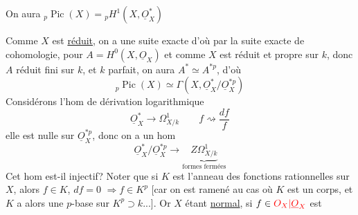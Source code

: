 On aura ${}_p\operatorname{Pic}(X)={}_pH^1(X,\underline O_X^*)$

Comme $X$ est \uline{réduit}, on a une suite exacte
d'où par la suite exacte de cohomologie, pour $A=H^0(X,\underline O_X)$
et comme $X$ est réduit et propre sur $k$, donc $A$ réduit
fini  sur $k$, et $k$ parfait, on aura
$A^*\simeq A^{*p}$, d'où
\[
{}_p\operatorname{Pic}(X)\simeq\Gamma(X,\underline O_X^*/\underline O_X^{*p})
\]
Considérons l'hom de dérivation logarithmique
\[
\underline O_X^*\longrightarrow\Omega^1_{X/k}\qquad
f\rightsquigarrow\frac{df}{f}
\]
elle est nulle sur $\underline O_X^{*p}$, donc on a un hom
\[
\underline O_X^*/\underline O_X^{*p}\longrightarrow
\underbrace{Z\Omega^1_{X/k}}_{\text{formes fermées}}
\]
Cet hom est-il injectif? Noter que si $K$ est l'anneau
des fonctions rationnelles sur $X$, alors $f\in K$, $df=0$
$\Rightarrow f\in K^p$ [car  on est ramené au cas où $K$
est un corps, et $K$  a alors une
$p$-base sur $K^p\supset k$...]. Or $X$ étant \uline{normal}, si $f\in{\color{red}O_X|\underline O_X}$ est

